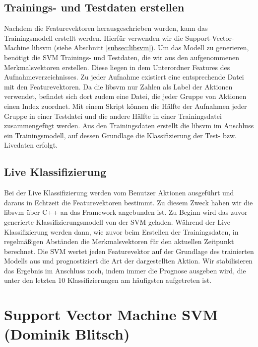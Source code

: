 \subsection{Trainings- und Testdaten erstellen}
\label{subsec:trainings-und-testdaten-erstellen}
Nachdem die Featurevektoren herausgeschrieben wurden, kann das Trainingsmodell erstellt werden. Hierfür verwenden wir die Support-Vector-Machine libsvm (siehe Abschnitt \ref{subsec:libsvm}). Um das Modell zu generieren, benötigt die SVM Trainings- und Testdaten, die wir aus den aufgenommenen Merkmalsvektoren erstellen. Diese liegen in dem Unterordner \glqq{}Features\grqq{} des Aufnahmeverzeichnisses. Zu jeder Aufnahme existiert eine entsprechende Datei mit den Featurevektoren. Da die libsvm nur Zahlen als Label der Aktionen verwendet, befindet sich dort zudem eine Datei, die jeder Gruppe von Aktionen einen Index zuordnet. Mit einem Skript können die Hälfte der Aufnahmen jeder Gruppe in einer Testdatei und die andere Hälfte in einer Trainingsdatei zusammengefügt werden. Aus den Trainingsdaten erstellt die libsvm im Anschluss ein Trainingsmodell, auf dessen Grundlage die Klassifizierung der Test- bzw. Livedaten erfolgt.

\subsection{Live Klassifizierung}
Bei der Live Klassifizierung werden vom Benutzer Aktionen ausgeführt und daraus in Echtzeit die Featurevektoren bestimmt. Zu diesem Zweck haben wir die libsvm über C++ an das Framework angebunden ist. Zu Beginn wird das zuvor generierte Klassifizierungsmodell von der SVM geladen. Während der Live Klassifizierung werden dann, wie zuvor beim Erstellen der Trainingsdaten, in regelmäßigen Abständen die Merkmalsvektoren für den aktuellen Zeitpunkt berechnet. Die SVM wertet jeden Featurevektor auf der Grundlage des trainierten Modells aus und prognostiziert die Art der dargestellten Aktion. Wir stabilisieren das Ergebnis im Anschluss noch, indem immer die Prognose ausgeben wird, die unter den letzten 10 Klassifizierungen am häufigsten aufgetreten ist. 



\section{Support Vector Machine SVM \tiny{(Dominik Blitsch)}}
\label{sec:support-vector-machine-svm}

